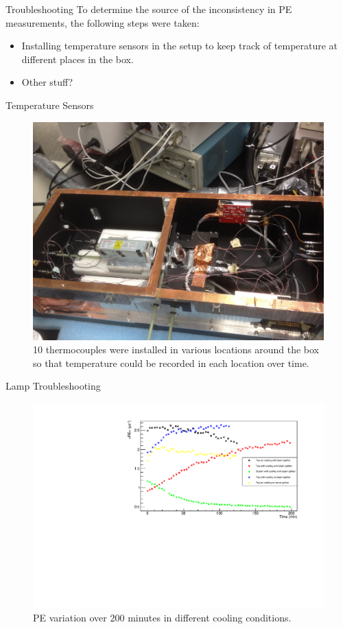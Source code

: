 \documentclass{beamer}
\begin{document}
\begin{frame}{Troubleshooting}
To determine the source of the inconsistency in PE measurements, the following steps were taken:\\
\begin{itemize}
\item Installing temperature sensors in the setup to keep track of temperature at different places in the box.
\item Other stuff?
\end{itemize}
\end{frame}

\begin{frame}{Temperature Sensors}
\begin{figure}
\centering
\includegraphics[height=0.5\textwidth]{sensors.JPG}
\caption{10 thermocouples were installed in various locations around the box so that temperature could be recorded in each location over time.}
\end{figure}
\end{frame}

\begin{frame}{Lamp Troubleshooting}
\begin{figure}
\centering
\includegraphics[height=0.5\textwidth]{NewLampPEAug5.pdf}
\caption{PE variation over 200 minutes in different cooling conditions.}
\end{figure}
\end{frame}
\end{document}
